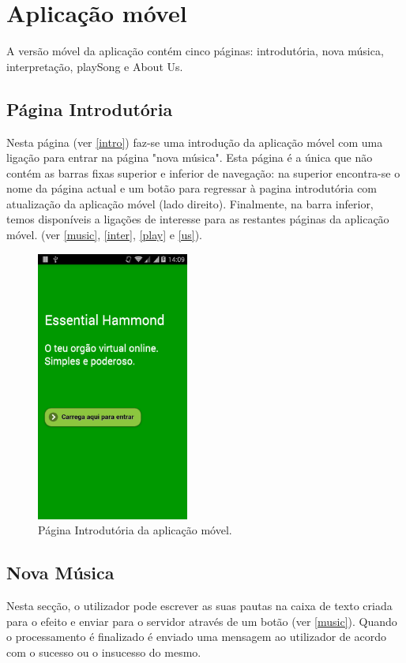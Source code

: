 \section{Aplicação móvel}
A versão móvel da aplicação contém cinco páginas: introdutória, nova música, interpretação, playSong e About Us.

\subsection{Página Introdutória}
Nesta página (ver \autoref{intro}) faz-se uma introdução da aplicação móvel com uma ligação para entrar na página "nova música". Esta página é a única que não contém as barras fixas superior e inferior de navegação: na superior encontra-se o nome da página actual e um botão para regressar à pagina introdutória com atualização da aplicação móvel (lado direito). Finalmente, na barra inferior, temos disponíveis a ligações de interesse para as restantes páginas da aplicação móvel. (ver \autoref{music}, \autoref{inter}, \autoref{play} e \autoref{us}).

\begin{figure}[htp]
\centering
\includegraphics[width=50mm]{images/appIntro.png}
\caption{Página Introdutória da aplicação móvel.}
\label{intro}
\end{figure}

\subsection{Nova Música}
Nesta secção, o utilizador pode escrever as suas pautas na caixa de texto criada para o efeito e enviar para o servidor através de um botão (ver \autoref{music}). Quando o processamento é finalizado é enviado uma mensagem ao utilizador de acordo com o sucesso ou o insucesso do mesmo. 

